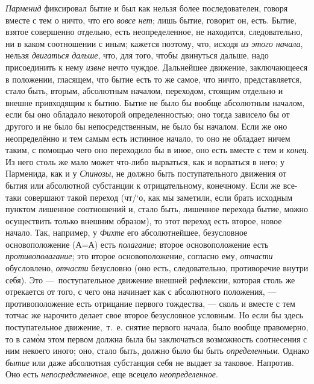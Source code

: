 {\em Парменид} фиксировал бытие и был как нельзя более
последователен, говоря вместе с тем о ничто, что его
{\em вовсе нет}; лишь бытие, говорит он, есть. Бытие,
взятое совершенно отдельно, есть неопределенное, не находится,
следовательно, ни в каком соотношении с иным; кажется поэтому, что,
исходя {\em из этого начала}, нельзя
{\em двигаться} {\em дальше}, что,
для того, чтобы двинуться дальше, надо присоединить к нему
{\em извне} нечто чуждое. Дальнейшее движение,
заключающееся в положении, гласящем, что бытие есть то же самое, что ничто,
представляется, стало быть, вторым, абсолютным началом, переходом, стоящим
отдельно и внешне привходящим к бытию. Бытие не было бы вообще абсолютным
началом, если бы оно обладало некоторой определенностью; оно тогда зависело
бы от другого и не было бы непосредственным, не было бы началом. Если же
оно неопределённо и тем самым есть истинное начало, то оно не обладает
ничем таким, с помощью чего оно переходило бы в иное, оно
есть вместе с тем и {\em конец}. Из него столь же мало
может что-либо вырваться, как и ворваться в него; у Парменида, как и у
{\em Спинозы}, не должно быть поступательного движения
от бытия или абсолютной субстанции к отрицательному, конечному. Если же
все-таки совершают такой переход (чт/`{о}, как мы заметили, если брать исходным
пунктом лишенное соотношений и, стало быть, лишенное перехода бытие, можно
осуществить только внешним образом), то этот переход есть второе, новое
начало. Так, например, у {\em Фихте} его абсолютнейшее,
безусловное основоположение (А=А) есть {\em полагание};
второе основоположение есть {\em противополагание}; это
второе основоположение, согласно ему, {\em отчасти}
обусловлено, {\em отчасти} безусловно (оно есть,
следовательно, противоречие внутри себя). Это ---~поступательное движение
внешней рефлексии, которая столь же отрекается от того, с чего она начинает
как с абсолютного положения, --- противоположение есть отрицание первого
тождества, --- сколь и вместе с тем тотчас же нарочито делает свое второе
безусловное условным. Но если бы здесь поступательное движение,~т.~е.
снятие первого начала, было вообще правомерно, то в сам\`{о}м этом первом
должна была бы заключаться возможность соотнесения с ним некоего иного;
 оно, стало быть, должно было бы быть
{\em определенным}. Однако
{\em бытие} или даже абсолютная субстанция себя не
выдает за таковое. Напротив. Оно есть
{\em непосредственное}, еще всецело
{\em неопределенное}.

